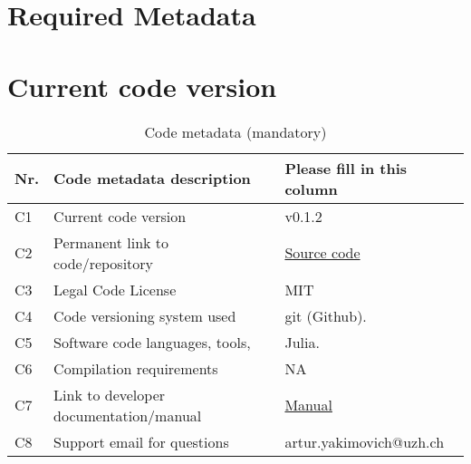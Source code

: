 \section{Required Metadata}
\label{}

\section{Current code version}
\label{}

\begin{table}
\begin{tabular}{lll}
\hline
\textbf{Nr.} & \textbf{Code metadata description} & \textbf{Please fill in this column} \\
\hline
C1 & Current code version & v0.1.2 \\
\hline
C2 & Permanent link to code/repository & \href{https://github.com/MatlabCompat/MatlabCompat.jl}{Source code} \\
\hline
C3 & Legal Code License   & MIT \\
\hline
C4 & Code versioning system used & git (Github). \\
\hline
C5 & Software code languages, tools, & Julia. \\
\hline
C6 & Compilation requirements & NA \\
\hline
C7 & Link to developer documentation/manual & \href{http://matlabcompat.github.io/help.html}{Manual}\\
\hline
C8 & Support email for questions & artur.yakimovich@uzh.ch\\
\hline
\end{tabular}
\caption{Code metadata (mandatory)}
\end{table}
  
  
  
  